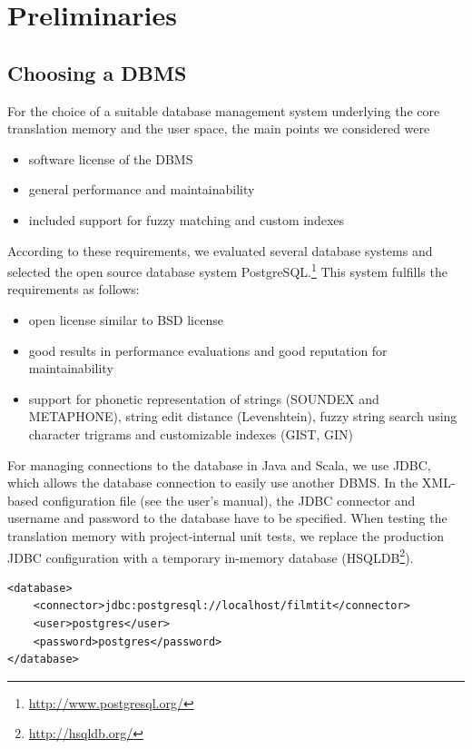 \section{Preliminaries}

\subsection{Choosing a DBMS}

For the choice of a suitable database management system underlying the
core translation memory and the user space, the main points we
considered were

\begin{itemize}
\item
  software license of the DBMS
\item
  general performance and maintainability
\item
  included support for fuzzy matching and custom indexes
\end{itemize}
According to these requirements, we evaluated several database systems
and selected the open source database system
PostgreSQL.\footnote{\url{http://www.postgresql.org/}} This system
fulfills the requirements as follows:

\begin{itemize}
\item
  open license similar to BSD license
\item
  good results in performance evaluations and good reputation for
  maintainability
\item
  support for phonetic representation of strings (SOUNDEX and
  METAPHONE), string edit distance (Levenshtein), fuzzy string search
  using character trigrams and customizable indexes (GIST, GIN)
\end{itemize}

For managing connections to the database in Java and Scala, we use JDBC, 
which allows the database connection to easily use another DBMS. 
In the XML-based configuration file (see the user's manual), the JDBC connector
and username and password to the database have to be specified. When testing the
translation memory with project-internal unit tests, we replace the production JDBC
configuration with a temporary in-memory database (HSQLDB\footnote{\url{http://hsqldb.org/}}).

\begin{lstlisting}
<database>
    <connector>jdbc:postgresql://localhost/filmtit</connector>
    <user>postgres</user>
    <password>postgres</password>
</database>
\end{lstlisting}




